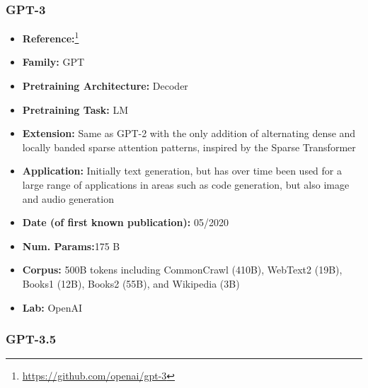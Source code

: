 \documentclass{article}
\begin{document}
\subsubsection{GPT-3}

            \begin{itemize}
                 \item \textbf{Reference:}\footnote{\url{https://github.com/openai/gpt-3}}\cite{brown2020language}
                 \item \textbf{Family:} GPT 
                \item \textbf{Pretraining Architecture:} Decoder
                \item \textbf{Pretraining Task:} LM
                \item \textbf{Extension:} Same as GPT-2 with the only addition of alternating dense and locally banded sparse attention patterns, inspired by the Sparse Transformer
                \item \textbf{Application:} Initially text generation, but has over time been used for a large range of applications in areas such as code generation, but also image and audio generation
                \item \textbf{Date (of first known publication):} 05/2020
                \item \textbf{Num. Params:}175 B
                \item \textbf{Corpus:} 500B tokens including CommonCrawl (410B), WebText2 (19B), Books1 (12B), Books2 (55B), and Wikipedia (3B)
                \item \textbf{Lab:} OpenAI
            \end{itemize}

\subsubsection{GPT-3.5}
\end{document}

